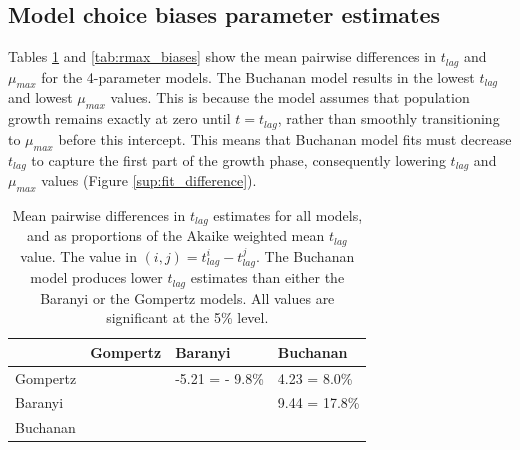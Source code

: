\documentclass[11pt, a4paper]{article}
\begin{document}
\begin{linenumbers}
\subsection{Model choice biases parameter estimates}

Tables \ref{tab:tlag_biases} and \ref{tab:rmax_biases} show the mean pairwise differences in $t_{lag}$ and $\mu_{max}$ for the 4-parameter models. The Buchanan model results in the lowest $t_{lag}$ and lowest $\mu_{max}$ values. This is because the model assumes that population growth remains exactly at zero until $t = t_{lag}$, rather than smoothly transitioning to $\mu_{max}$ before this intercept. This means that Buchanan model fits must decrease $t_{lag}$ to capture the first part of the growth phase, consequently lowering $t_{lag}$ and $\mu_{max}$ values (Figure \ref{sup:fit_difference}).

\begin{table}[H]
\centering
\begin{tabular}{l|lll}
         & Gompertz                                        & Baranyi                                         & Buchanan                 \\ \hline
Gompertz & \cellcolor[HTML]{9B9B9B}                        & -5.21 = - 9.8\%                                           & 4.23 = 8.0\%                     \\
Baranyi  & \cellcolor[HTML]{9B9B9B}{\color[HTML]{9B9B9B} } & \cellcolor[HTML]{9B9B9B}{\color[HTML]{9B9B9B} } & 9.44 = 17.8\%                     \\
Buchanan & \cellcolor[HTML]{9B9B9B}{\color[HTML]{9B9B9B} } & \cellcolor[HTML]{9B9B9B}                        & \cellcolor[HTML]{9B9B9B}
\end{tabular}
\caption{Mean pairwise differences in $t_{lag}$ estimates for all models, and as proportions of the Akaike weighted mean $t_{lag}$ value. The value in $(i, j) = t_{lag}^i - t_{lag}^j$. The Buchanan model produces lower $t_{lag}$ estimates than either the Baranyi or the Gompertz models. All values are significant at the 5\% level.}
\label{tab:tlag_biases}
\end{table}



\end{linenumbers}
\end{document}
